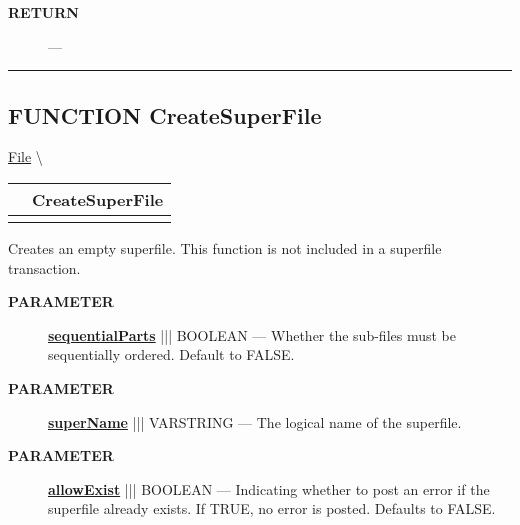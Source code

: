 \par
\begin{description}
\item [\colorbox{tagtype}{\color{white} \textbf{\textsf{RETURN}}}] \textbf{} --- 
\end{description}




\rule{\linewidth}{0.5pt}
\subsection*{\textsf{\colorbox{headtoc}{\color{white} FUNCTION}
CreateSuperFile}}

\hypertarget{ecldoc:file.createsuperfile}{}
\hspace{0pt} \hyperlink{ecldoc:File}{File} \textbackslash 

{\renewcommand{\arraystretch}{1.5}
\begin{tabularx}{\textwidth}{|>{\raggedright\arraybackslash}l|X|}
\hline
\hspace{0pt}\mytexttt{\color{red} } & \textbf{CreateSuperFile} \\
\hline
\multicolumn{2}{|>{\raggedright\arraybackslash}X|}{\hspace{0pt}\mytexttt{\color{param} (varstring superName, boolean sequentialParts=FALSE, boolean allowExist=FALSE)}} \\
\hline
\end{tabularx}
}

\par





Creates an empty superfile. This function is not included in a superfile transaction.






\par
\begin{description}
\item [\colorbox{tagtype}{\color{white} \textbf{\textsf{PARAMETER}}}] \textbf{\underline{sequentialParts}} ||| BOOLEAN --- Whether the sub-files must be sequentially ordered. Default to FALSE.
\item [\colorbox{tagtype}{\color{white} \textbf{\textsf{PARAMETER}}}] \textbf{\underline{superName}} ||| VARSTRING --- The logical name of the superfile.
\item [\colorbox{tagtype}{\color{white} \textbf{\textsf{PARAMETER}}}] \textbf{\underline{allowExist}} ||| BOOLEAN --- Indicating whether to post an error if the superfile already exists. If TRUE, no error is posted. Defaults to FALSE.
\end{description}







